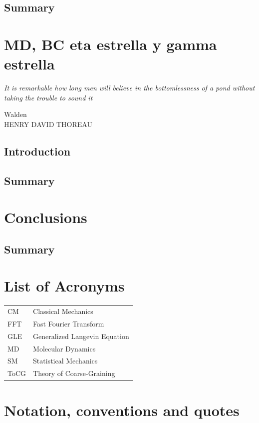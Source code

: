 \documentclass[a4paper,openright,12pt]{book}
\begin{document}
\section{Summary}

\chapter{MD, BC eta estrella y gamma estrella}\label{cap.}
\epigraph{\textit{It is remarkable how long men will believe in the bottomlessness of a pond without taking the trouble to sound it}}{Walden \\ HENRY DAVID THOREAU}
\section{Introduction}
\section{Summary}


\chapter{Conclusions}\label{cap.Conclusions}
\section{Summary}

\appendix
\chapter{List of Acronyms}\label{aped.A}
\begin{tabular}{l l}
    CM & Classical Mechanics \\
    FFT & Fast Fourier Transform \\
    GLE & Generalized Langevin Equation \\
    MD & Molecular Dynamics \\
    SM & Statistical Mechanics \\
    ToCG & Theory of Coarse-Graining \\
\end{tabular}

\chapter{Notation, conventions and quotes}\label{aped.B}
\end{document}
